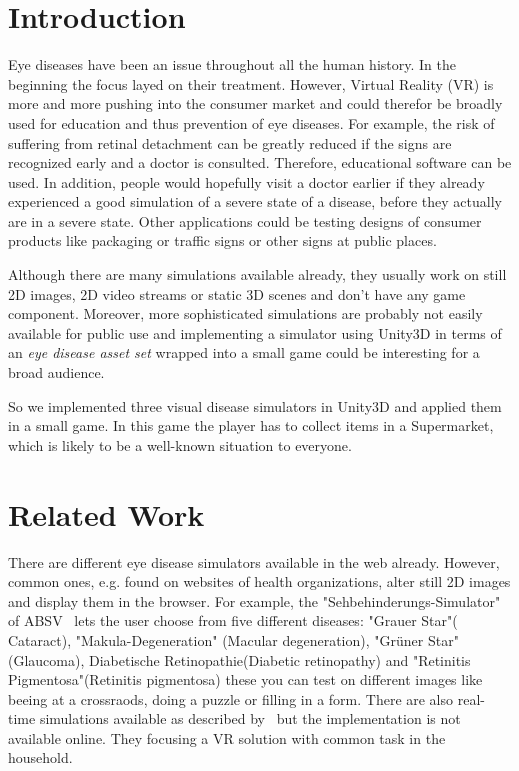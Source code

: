 \documentclass{sig-alternate-05-2015}
\begin{document}
%

%
%
% 

\section{Introduction}
Eye diseases have been an issue throughout all the human history.
In the beginning the focus layed on their treatment.
However, Virtual Reality (VR) is more and more pushing into the consumer market and could therefor be broadly used for education and thus prevention of eye diseases.
For example, the risk of suffering from retinal detachment can be greatly reduced if the signs are recognized early and a doctor is consulted.
Therefore, educational software can be used.
In addition, people would hopefully visit a doctor earlier if they already experienced a good simulation of a severe state of a disease, before they actually are in a severe state.
Other applications could be testing designs of consumer products like packaging or traffic signs or other signs at public places.

Although there are many simulations available already, they usually work on still 2D images, 2D video streams or static 3D scenes and don't have any game component.
Moreover, more sophisticated simulations are probably not easily available for public use and implementing a simulator using Unity3D in terms of an \emph{eye disease asset set} wrapped into a small game could be interesting for a broad audience.

So we implemented three visual disease simulators in Unity3D and applied them in a small game.
In this game the player has to collect items in a Supermarket, which is likely to be a well-known situation to everyone.

\section{Related Work}
There are different eye disease simulators available in the web already.
However, common ones, e.g. found on websites of health organizations, alter still 2D images and display them in the browser.
For example, the "Sehbehinderungs-Simulator" of ABSV~\cite{absv} lets the user choose from five different diseases: "Grauer Star"( Cataract), "Makula-Degeneration" (Macular degeneration), "Grüner Star" (Glaucoma), Diabetische Retinopathie(Diabetic retinopathy) and "Retinitis Pigmentosa"(Retinitis pigmentosa) these you can test on different images like beeing at a crossraods, doing a puzzle or filling in a form. 
There are also real-time simulations available as described by~\cite{eyediseasesim-zhuming} but the implementation is not available online. They focusing a VR solution with common task in the household.
\end{document}
